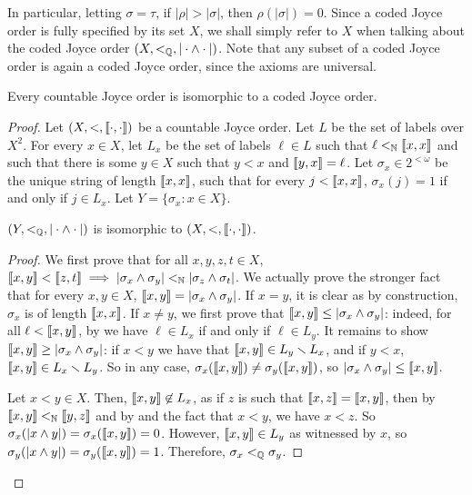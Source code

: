 In particular, letting $\sigma = \tau$, if $|\rho| > |\sigma|$, then $\rho(|\sigma|) = 0$.
Since a coded Joyce order is fully specified by its set $X$, we shall simply refer to $X$ when talking about the coded Joyce order $(X, <_{\mathbb{Q}}, |\cdot \wedge \cdot|)$. Note that any subset of a coded Joyce order is again a coded Joyce order, since the axioms are universal.

\begin{theorem}[$\RCA_0$]\label{thm:joyce-orders-can-be-coded}
Every countable Joyce order is isomorphic to a coded Joyce order.
\end{theorem}
\begin{proof}
Let $(X, <, \llbracket \cdot , \cdot \rrbracket)$ be a countable Joyce order.
Let $L$ be the set of labels over $X^2$. For every $x \in X$, let $L_x$ be the set of labels $\ell \in L$ such that $\ell <_{\mathbb{N}} \llbracket x , x \rrbracket$ and such that there is some $y \in X$ such that $y < x$ and $\llbracket y , x \rrbracket = \ell$.
Let $\sigma_x \in 2^{<\omega}$ be the unique string of length $\llbracket x , x \rrbracket$, such that for every $j < \llbracket x , x \rrbracket$, $\sigma_x(j) = 1$ if and only if $j \in L_x$.
Let $Y = \{ \sigma_x: x \in X \}$.

\begin{claim}
$(Y, <_{\mathbb{Q}}, |\cdot \wedge \cdot|)$ is isomorphic to $(X, <, \llbracket \cdot , \cdot \rrbracket)$.
\end{claim}
\begin{proof}
We first prove that for all $x,y,z,t\in X$, $\llbracket x , y \rrbracket<\llbracket z , t \rrbracket\implies |\sigma_x\wedge \sigma_y|<_{\mathbb{N}}|\sigma_z\wedge \sigma_t|$. We actually prove the stronger fact that for every $x,y\in X$, $\llbracket x , y \rrbracket = |\sigma_x\wedge\sigma_y|$. If $x=y$, it is clear as by construction, $\sigma_x$ is of length $\llbracket x , x \rrbracket$. If $x\neq y$, we first prove that $\llbracket x , y \rrbracket \leq |\sigma_x\wedge\sigma_y|$: indeed, for all $\ell<\llbracket x , y \rrbracket$, by  we have $\ell\in L_x$ if and only if $\ell\in L_y$. It remains to show $\llbracket x , y \rrbracket \geq |\sigma_x\wedge\sigma_y|$: if $x<y$ we have that $\llbracket x , y \rrbracket\in L_y\smallsetminus L_x$, and if $y<x$, $\llbracket x , y \rrbracket\in L_x\smallsetminus L_y$. So in any case, $\sigma_x(\llbracket x , y \rrbracket)\neq\sigma_y(\llbracket x , y \rrbracket)$, so $|\sigma_x\wedge\sigma_y|\leq\llbracket x , y \rrbracket$.

Let $x<y\in X$. Then, $\llbracket x , y \rrbracket\not\in L_x$, as if $z$ is such that $\llbracket x , z \rrbracket=\llbracket x , y \rrbracket$, then by  $\llbracket x , y \rrbracket<_{\mathbb{N}}\llbracket y , z \rrbracket$ and by  and the fact that $x<y$, we have $x<z$. So $\sigma_x(|x\wedge y|)=\sigma_x(\llbracket x , y \rrbracket)=0$. However, $\llbracket x , y \rrbracket\in L_y$ as witnessed by $x$, so $\sigma_y(|x\wedge y|)=\sigma_y(\llbracket x , y \rrbracket)=1$. Therefore, $\sigma_x<_{\mathbb{Q}}\sigma_y$.
\end{proof}


\end{proof}
